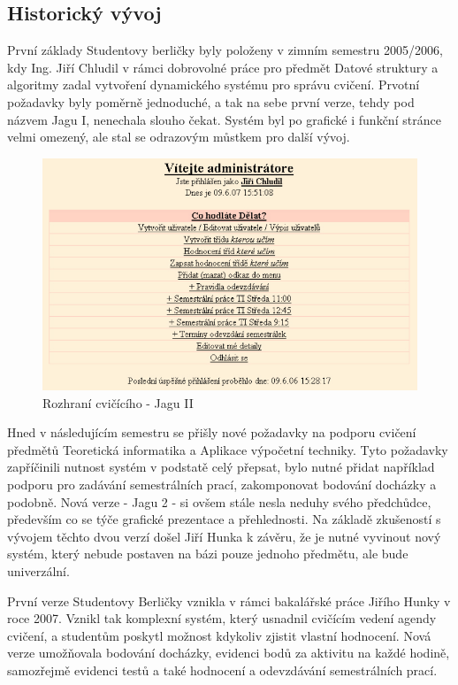\documentclass[11pt,twoside,a4paper]{book}
\begin{document}
\subsection{Historický vývoj}
První základy Studentovy berličky byly položeny v zimním semestru 2005/2006, kdy Ing. Jiří Chludil v rámci dobrovolné práce pro předmět Datové struktury a algoritmy zadal vytvoření dynamického systému pro správu cvičení. Prvotní požadavky byly poměrně jednoduché, a tak na sebe první verze, tehdy pod názvem Jagu I, nenechala slouho čekat. Systém byl po grafické i funkční stránce velmi omezený, ale stal se odrazovým můstkem pro další vývoj.
\begin{figure}[h]
\begin{center}
\includegraphics[width=15cm]{figures/jaguI.png}
\caption{Rozhraní cvičícího - Jagu II}
\label{fig:jaguI}
\end{center}
\end{figure}

Hned v následujícím semestru se přišly nové požadavky na podporu cvičení předmětů Teoretická informatika a Aplikace výpočetní techniky. Tyto požadavky zapříčinili nutnost systém v podstatě celý přepsat, bylo nutné přidat například podporu pro zadávání semestrálních prací, zakomponovat bodování docházky a podobně. Nová verze - Jagu 2 - si ovšem stále nesla neduhy svého předchůdce, především co se týče grafické prezentace a přehlednosti. Na základě zkušeností s vývojem těchto dvou verzí došel Jiří Hunka k závěru, že je nutné vyvinout nový systém, který nebude postaven na bázi pouze jednoho předmětu, ale bude univerzální.

První  verze Studentovy Berličky vznikla v rámci bakalářské práce Jiřího Hunky v roce 2007. Vznikl tak komplexní systém, který usnadnil cvičícím vedení agendy cvičení, a studentům poskytl možnost kdykoliv zjistit vlastní hodnocení. Nová verze umožňovala bodování docházky, evidenci bodů za aktivitu na každé hodině, samozřejmě evidenci testů a také hodnocení a odevzdávání semestrálních prací.
\end{document}
